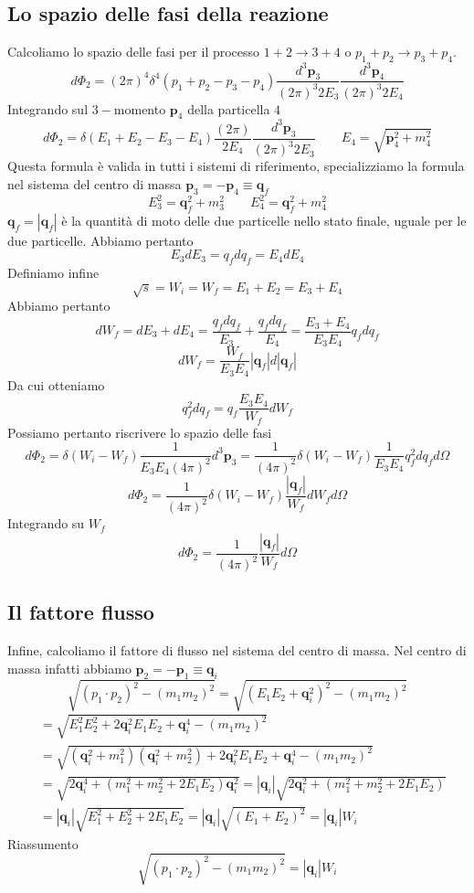 \subsection{Lo spazio delle fasi della reazione}
Calcoliamo lo spazio delle fasi per il processo $1+2\to 3+4$ o $p_1+p_2\to p_3+p_4$.
$$
d\Phi_2 = (2\pi)^4 \delta^4(p_1 + p_2 - p_3 - p_4) \frac{d^3\mathbf{p}_3}{(2\pi)^3 2E_3} \frac{d^3\mathbf{p}_4}{(2\pi)^3 2E_4}
$$
Integrando sul $3-$momento $\mathbf{p}_4$ della particella $4$
$$
d\Phi_2 = \delta(E_1 + E_2 - E_3 - E_4) \frac{(2\pi)}{2E_4} \frac{d^3\mathbf{p}_3}{(2\pi)^3 2E_3} \qquad E_4 = \sqrt{\mathbf{p}_4^2 + m_4^2}
$$
Questa formula è valida in tutti i sistemi di riferimento, specializziamo la formula nel sistema del centro di massa $\mathbf{p}_3=-\mathbf{p}_4\equiv \mathbf{q}_f$
$$
E_3^2 = \mathbf{q}_f^2 + m_3^2 \qquad E_4^2 = \mathbf{q}_f^2 + m_4^2
$$
$\mathbf{q}_f=|\mathbf{q}_f|$ è la quantità di moto delle due particelle nello stato finale, uguale per le due particelle. Abbiamo pertanto
$$
E_3 dE_3 = q_f dq_f = E_4 dE_4
$$
Definiamo infine
$$
\sqrt{s} = W_i = W_f = E_1 + E_2 = E_3 + E_4
$$
Abbiamo pertanto
$$
dW_f = dE_3 + dE_4 = \frac{q_f dq_f}{E_3} + \frac{q_f dq_f}{E_4} = \frac{E_3 + E_4}{E_3 E_4} q_f dq_f
$$
$$
dW_f = \frac{W_f}{E_3 E_4} |\mathbf{q}_f| d|\mathbf{q}_f|
$$
Da cui otteniamo
$$
q_f^2 dq_f = q_f \frac{E_3 E_4}{W_f} dW_f
$$
Possiamo pertanto riscrivere lo spazio delle fasi
$$
d\Phi_2 = \delta(W_i - W_f) \frac{1}{E_3 E_4 (4\pi)^2} d^3\mathbf{p}_3 = \frac{1}{(4\pi)^2} \delta(W_i - W_f) \frac{1}{E_3 E_4} q_f^2 dq_f d\Omega
$$
$$
d\Phi_2 = \frac{1}{(4\pi)^2} \delta(W_i - W_f) \frac{|\mathbf{q}_f|}{W_f} dW_f d\Omega
$$
Integrando su $W_f$
$$
d\Phi_2 = \frac{1}{(4\pi)^2} \frac{|\mathbf{q}_f|}{W_f} d\Omega
$$
\subsection{Il fattore flusso}
Infine, calcoliamo il fattore di flusso nel sistema del centro di massa. Nel centro di massa infatti abbiamo $\mathbf{p}_2=-\mathbf{p}_1\equiv\mathbf{q}_i$
$$
\sqrt{(p_1 \cdot p_2)^2 - (m_1 m_2)^2} = \sqrt{(E_1 E_2 + \mathbf{q}_i^2)^2 - (m_1 m_2)^2}
$$
\begin{align*}
    &= \sqrt{E_1^2 E_2^2 + 2\mathbf{q}_i^2 E_1 E_2 + \mathbf{q}_i^4 - (m_1 m_2)^2}\\
    &= \sqrt{(\mathbf{q}_i^2 + m_1^2)(\mathbf{q}_i^2 + m_2^2) + 2\mathbf{q}_i^2 E_1 E_2 + \mathbf{q}_i^4 - (m_1 m_2)^2} \\
    &= \sqrt{2\mathbf{q}_i^4 + (m_1^2 + m_2^2 + 2E_1 E_2)\mathbf{q}_i^2} = |\mathbf{q}_i| \sqrt{2\mathbf{q}_i^2 + (m_1^2 + m_2^2 + 2E_1 E_2)} \\
    &= |\mathbf{q}_i| \sqrt{E_1^2 + E_2^2 + 2E_1 E_2} = |\mathbf{q}_i| \sqrt{(E_1 + E_2)^2} = |\mathbf{q}_i| W_i
\end{align*}
Riassumento
$$
\sqrt{(p_1 \cdot p_2)^2 - (m_1 m_2)^2} = |\mathbf{q}_i| W_i
$$
